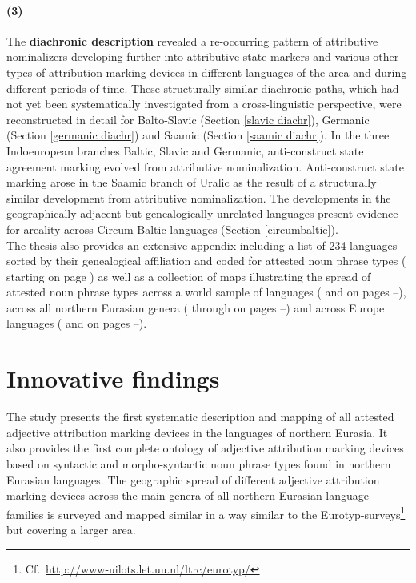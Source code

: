 \paragraph{(3)} The {\bf diachronic description} revealed a re-occurring pattern of attributive nominalizers developing further into attributive state markers and various other types of attribution marking devices in different languages of the area and during different periods of time. These structurally similar diachronic paths, which had not yet been systematically investigated from a cross-linguistic perspective, were reconstructed in detail for Balto-Slavic (Section \ref{slavic diachr}), Germanic (Section \ref{germanic diachr}) and Saamic (Section \ref{saamic diachr}). In the three Indoeuropean branches Baltic, Slavic and Germanic, anti-construct state agreement marking evolved from attributive nominalization. Anti-construct state marking arose in the Saamic branch of Uralic as the result of a structurally similar development from attributive nominalization. The developments in the geographically adjacent but genealogically unrelated languages present evidence for areality across Circum-Baltic languages (Section \ref{circumbaltic}).\\

\noindent The thesis also provides an extensive appendix including a list of 234 languages sorted by their genealogical affiliation and coded for attested noun phrase types ( starting on page \pageref{sample}) as well as a collection of maps illustrating the spread of attested noun phrase types across a world sample of languages ( and  on pages \pageref{WorldMap}–\pageref{WorldMapTyp}), across all northern Eurasian genera ( through  on pages \pageref{NEMap}–\pageref{NAMapTyp}) and across Europe languages ( and  on pages \pageref{EUMap}–\pageref{EUMapTyp}).

\section{Innovative findings}
The study presents the first systematic description and mapping of all attested adjective attribution marking devices in the languages of northern Eurasia. It also provides the first complete ontology of adjective attribution marking devices based on syntactic and morpho-syntactic noun phrase types found in northern Eurasian languages. The geographic spread of different adjective attribution marking devices across the main genera of all northern Eurasian language families is surveyed and mapped similar in a way similar to the Eurotyp-surveys\footnote{Cf.~\url{http://www-uilots.let.uu.nl/ltrc/eurotyp/}} but covering a larger area. 

